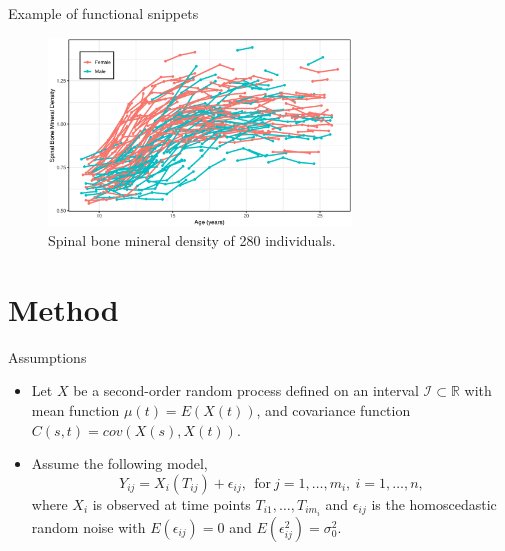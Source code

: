 \documentclass[9pt]{beamer}
\begin{document}
\begin{frame}[allowframebreaks]{Example of functional snippets}
	\begin{figure}[h]
		\centering
		\includegraphics[height=5cm,keepaspectratio=true]{img/spnbmd.eps}
		\caption{Spinal bone mineral density of 280 individuals.}
	\end{figure}
\end{frame}



\section{Method}\label{ch2}

\begin{frame}[allowframebreaks]{Assumptions}
	\begin{itemize}
		\item{
			Let $X$ be a second-order random process defined on an interval $\mathcal{I} \subset \mathbb{R}$ with mean function $\mu(t) = E(X(t))$, and covariance function $C(s,t) = cov(X(s),X(t))$.
		}
		\item{
			Assume the following model,
			$$
			Y_{ij} = X_i(T_{ij}) + \epsilon_{ij}, ~~ \text{for} ~ j=1, \ldots, m_i,~ i=1, \ldots, n,
			$$
			where $X_i$ is observed at time points $T_{i1}, \ldots, T_{im_i}$ and $\epsilon_{ij}$ is the homoscedastic random noise with $E(\epsilon_{ij})=0$ and $E (\epsilon_{ij}^2)= \sigma_0^2$.
		}
	\end{itemize}
\end{frame}
\end{document}
